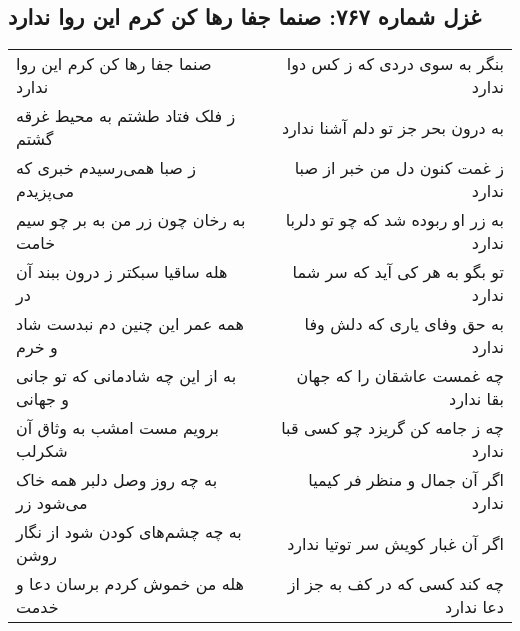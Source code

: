 \begin{center}
\section*{غزل شماره ۷۶۷: صنما جفا رها کن کرم این روا ندارد}
\label{sec:0767}
\begin{longtable}{l p{0.5cm} r}
صنما جفا رها کن کرم این روا ندارد
&&
بنگر به سوی دردی که ز کس دوا ندارد
\\
ز فلک فتاد طشتم به محیط غرقه گشتم
&&
به درون بحر جز تو دلم آشنا ندارد
\\
ز صبا همی‌رسیدم خبری که می‌پزیدم
&&
ز غمت کنون دل من خبر از صبا ندارد
\\
به رخان چون زر من به بر چو سیم خامت
&&
به زر او ربوده شد که چو تو دلربا ندارد
\\
هله ساقیا سبکتر ز درون ببند آن در
&&
تو بگو به هر کی آید که سر شما ندارد
\\
همه عمر این چنین دم نبدست شاد و خرم
&&
به حق وفای یاری که دلش وفا ندارد
\\
به از این چه شادمانی که تو جانی و جهانی
&&
چه غمست عاشقان را که جهان بقا ندارد
\\
برویم مست امشب به وثاق آن شکرلب
&&
چه ز جامه کن گریزد چو کسی قبا ندارد
\\
به چه روز وصل دلبر همه خاک می‌شود زر
&&
اگر آن جمال و منظر فر کیمیا ندارد
\\
به چه چشم‌های کودن شود از نگار روشن
&&
اگر آن غبار کویش سر توتیا ندارد
\\
هله من خموش کردم برسان دعا و خدمت
&&
چه کند کسی که در کف به جز از دعا ندارد
\\
\end{longtable}
\end{center}
